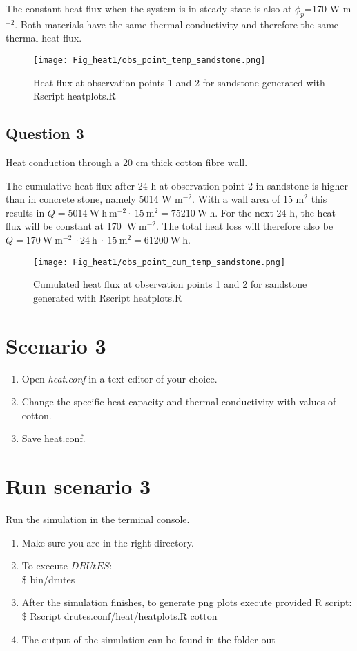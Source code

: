 The constant heat flux when the system is in steady state is also at $\phi_{p}$=170 W m$^{-2}$. Both materials have the same thermal conductivity and therefore the same thermal heat flux.

\begin{figure}[!h]
\centering
\texttt{[image: Fig\_heat1/obs\_point\_temp\_sandstone.png]}
\caption{\label{plot5} Heat flux at observation points 1 and 2 for sandstone generated with Rscript heatplots.R}
\end{figure}


\subsection*{Question 3}
Heat conduction through a 20 cm thick cotton fibre wall. 

The cumulative heat flux after 24 h at observation point 2 in sandstone is higher than in concrete stone, namely 5014 W m$^{-2}$. With a wall area of 15 m$^2$ this results in $Q = 5014~\mathrm{W~h~m^{-2}}\cdot~15~\mathrm{m^{2}}= 75210 ~\mathrm{W~h}$. 
For the next 24 h, the heat flux will be constant at 170 $\mathrm{~W~m^{-2}}$. The total heat loss will therefore also be $Q=170 \mathrm{~W~m^{-2}}~\cdot 24~\mathrm{h}~\cdot~15~\mathrm{m^{2}}=61200 \mathrm{~W~h}$.

\begin{figure}[!h]
\centering
\texttt{[image: Fig\_heat1/obs\_point\_cum\_temp\_sandstone.png]}
\caption{\label{plot6} Cumulated heat flux at observation points 1 and 2 for sandstone generated with Rscript heatplots.R}
\end{figure}

\newpage
\newpage
\newpage
\clearpage
\section*{Scenario 3}

\begin{enumerate}
\item Open \emph{heat.conf} in a text editor of your choice. 
\item Change the specific heat capacity and thermal conductivity with values of cotton.
\item Save heat.conf.
\end{enumerate}

\section*{Run scenario 3}
Run the simulation in the terminal console.
\begin{enumerate}
\item Make sure you are in the right directory. 
\item To execute $DRUtES$: \\
\$ bin/drutes
\item After the simulation finishes, to generate png plots execute provided R script: \\
\$ Rscript drutes.conf/heat/heatplots.R cotton
\item The output of the simulation can be found in the folder out
\end{enumerate}

